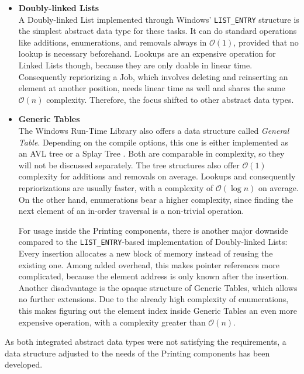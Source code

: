 \begin{itemize}
	\item \textbf{Doubly-linked Lists} \\
				A Doubly-linked List implemented through Windows' \texttt{LIST\_ENTRY} structure is the simplest abstract data type for these tasks.
				It can do standard operations like additions, enumerations, and removals always in $\mathcal{O}(1)$, provided that no lookup is necessary beforehand.
				Lookups are an expensive operation for Linked Lists though, because they are only doable in linear time.
				Consequently repriorizing a Job, which involves deleting and reinserting an element at another position, needs linear time as well and shares the same $\mathcal{O}(n)$ complexity.
				Therefore, the focus shifted to other abstract data types.
	
	\item \textbf{Generic Tables} \\
				The Windows Run-Time Library also offers a data structure called \emph{General Table}.
				Depending on the compile options, this one is either implemented as an \gls{AVL} tree or a Splay Tree \cite{osr2008splaytrees}.
				Both are comparable in complexity, so they will not be discussed separately.
				The tree structures also offer $\mathcal{O}(1)$ complexity for additions and removals on average.
				Lookups and consequently repriorizations are usually faster, with a complexity of $\mathcal{O}(\log n)$ on average.
				On the other hand, enumerations bear a higher complexity, since finding the next element of an in-order traversal is a non-trivial operation.
				
				For usage inside the Printing components, there is another major downside compared to the \texttt{LIST\_ENTRY}-based implementation of Doubly-linked Lists:
				Every insertion allocates a new block of memory instead of reusing the existing one.
				Among added overhead, this makes pointer references more complicated, because the element address is only known after the insertion.
				Another disadvantage is the opaque structure of Generic Tables, which allows no further extensions.
				Due to the already high complexity of enumerations, this makes figuring out the element index inside Generic Tables an even more expensive operation, with a complexity greater than $\mathcal{O}(n)$.
\end{itemize}

As both integrated abstract data types were not satisfying the requirements, a data structure adjusted to the needs of the Printing components has been developed.


